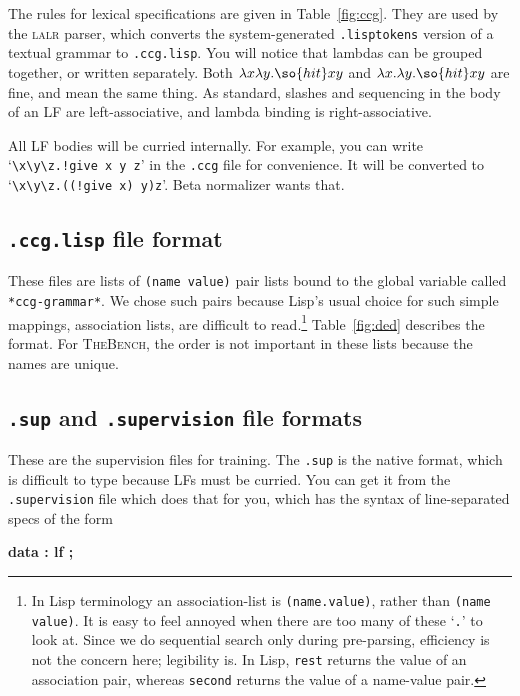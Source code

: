 \documentclass[11pt]{article}
\newcommand{\tool}{\textsc{TheBench}}
\begin{document}
{\noindent The rules for lexical specifications are given in Table~\ref{fig:ccg}. They are used by the \textsc{lalr} parser,
which converts the system-generated \verb|.lisptokens| version of a textual grammar to \verb|.ccg.lisp|. You will notice
that lambdas can be grouped together, or written separately. Both $\lambda x\lambda y.\so{hit}xy$
and $\lambda x.\lambda y.\so{hit}xy$ are fine, and mean the same thing. As standard,  slashes and sequencing in the body of an LF are left-associative, and lambda binding is right-associative. 

All LF bodies will be curried internally.
For example, you can write `\verb|\x\y\z.!give x y z|' in the \verb|.ccg| file for convenience. It will be converted
to `\verb|\x\y\z.((!give x) y)z|'. Beta normalizer wants that.



\subsection{\texttt{.ccg.lisp} file format}

These files are lists of \verb|(name value)| pair lists bound to the global variable called \verb|*ccg-grammar*|. We chose
such pairs because Lisp's usual choice for such simple mappings, association lists, are difficult to 
read.\footnote{In Lisp terminology an association-list is \texttt{(name.value)}, rather than \texttt{(name value)}. 
It is easy to feel annoyed when there are too many of these `\texttt{.}' to look at. Since we do sequential search only during pre-parsing, efficiency is not the concern here; legibility is. In Lisp, \texttt{rest} returns the value of an association pair, whereas \texttt{second} returns the value of a name-value pair.} 
Table~\ref{fig:ded} describes the format.
For \tool, the order is not important in these lists because the names are unique.



\subsection{\texttt{.sup} {and \texttt{.supervision} file formats}}\label{sec:sup}
These are the supervision files for training. The {\texttt{.sup} is the native format, which is difficult to type
because LFs must be curried.
You can get it from the \texttt{.supervision} file which does that for you, which has the syntax of line-separated
specs of the form}

\textbf{data : lf ;} 

}
\end{document}
